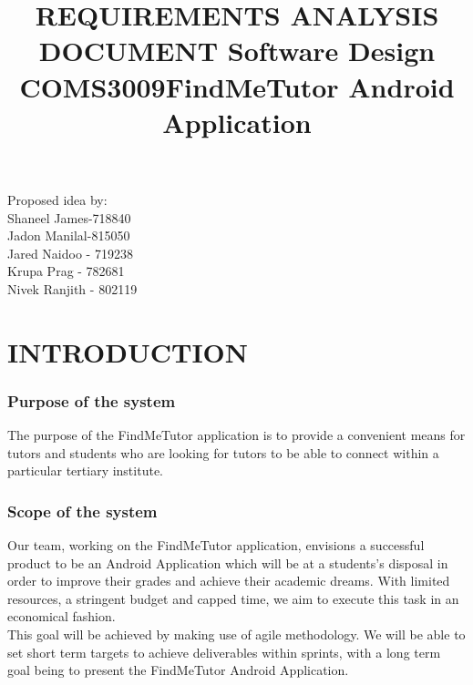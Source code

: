 \documentclass[12pt]{article}
\begin{document}
\title{\textbf{REQUIREMENTS ANALYSIS DOCUMENT }}
\maketitle

\begin{center}
\title{\textbf{Software Design COMS3009}}
\maketitle 
\end{center}
\begin{center}
\title{\textbf{FindMeTutor Android Application}}
\maketitle 
\end{center}

\begin{center}
Proposed idea by:\\
Shaneel James-718840
\\Jadon Manilal-815050
\\Jared Naidoo - 719238
\\Krupa Prag - 782681
\\Nivek Ranjith - 802119
\end{center}

\newpage

\tableofcontents
\newpage
\section{INTRODUCTION}
\subsubsection{Purpose of the system}
\begin{flushleft}
The purpose of the FindMeTutor application is to provide a convenient means for tutors and students who are looking for tutors to be able to connect within a particular tertiary institute.
\end{flushleft}
\subsubsection{Scope of the system}
\begin{flushleft}
Our team, working on the FindMeTutor application, envisions a successful product to be an Android Application which will be at a students's disposal in order to improve their grades and achieve their academic dreams. With limited resources, a stringent budget and capped time, we aim to execute this task in an economical fashion.\\
This goal will be achieved by making use of agile methodology. We will be able to set short term targets to achieve deliverables within sprints, with a long term goal being to present the FindMeTutor Android Application. 
\end{flushleft}
\end{document}
